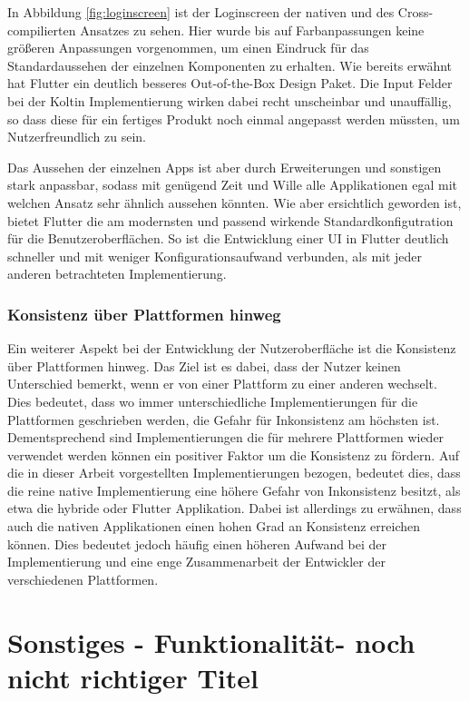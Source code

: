 In Abbildung \ref{fig:loginscreen} ist der Loginscreen der nativen und des Cross-compilierten Ansatzes zu sehen. Hier wurde bis auf Farbanpassungen keine größeren Anpassungen vorgenommen, um einen Eindruck für das Standardaussehen der einzelnen Komponenten zu erhalten. Wie bereits erwähnt hat Flutter ein deutlich besseres Out-of-the-Box Design Paket. Die Input Felder bei der Koltin Implementierung wirken dabei recht unscheinbar und unauffällig, so dass diese für ein fertiges Produkt noch einmal angepasst werden müssten, um Nutzerfreundlich zu sein.

Das Aussehen der einzelnen Apps ist aber durch Erweiterungen und sonstigen stark anpassbar, sodass mit genügend Zeit und Wille alle Applikationen egal mit welchen Ansatz sehr ähnlich aussehen könnten. Wie aber ersichtlich geworden ist, bietet Flutter die am modernsten und passend wirkende Standardkonfigutration für die Benutzeroberflächen. So ist die Entwicklung einer UI in Flutter deutlich schneller und mit weniger Konfigurationsaufwand verbunden, als mit jeder anderen betrachteten Implementierung.

\subsubsection{Konsistenz über Plattformen hinweg}
Ein weiterer Aspekt bei der Entwicklung der Nutzeroberfläche ist die Konsistenz über Plattformen hinweg. Das Ziel ist es dabei, dass der Nutzer keinen Unterschied bemerkt, wenn er von einer Plattform zu einer anderen wechselt. 
Dies bedeutet, dass wo immer unterschiedliche Implementierungen für die Plattformen geschrieben werden, die Gefahr für Inkonsistenz am höchsten ist.
Dementsprechend sind Implementierungen die für mehrere Plattformen wieder verwendet werden können ein positiver Faktor um die Konsistenz zu fördern.
Auf die in dieser Arbeit vorgestellten Implementierungen bezogen, bedeutet dies, dass die reine native Implementierung eine höhere Gefahr von Inkonsistenz besitzt, als etwa die hybride oder Flutter Applikation.
Dabei ist allerdings zu erwähnen, dass auch die nativen Applikationen einen hohen Grad an Konsistenz erreichen können. Dies bedeutet jedoch häufig einen höheren Aufwand bei der Implementierung und eine enge Zusammenarbeit der Entwickler der verschiedenen Plattformen.

\section{Sonstiges - Funktionalität- noch nicht richtiger Titel}

